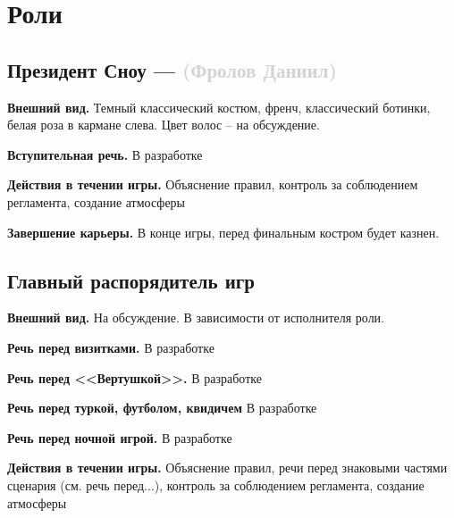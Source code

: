 \documentclass[a4paper, 14pt]{extarticle}
\theoremstyle{definition}
\begin{document}
\cleardoublepage
{}
{}
\section*{Роли}

{}
\subsection*{Президент Сноу --- \textcolor{lightgray}{(Фролов Даниил)}}

\par \textbf{Внешний вид.} Темный классический костюм, френч, классический ботинки, белая роза в кармане слева. Цвет волос -- на обсуждение.

\par \textbf{Вступительная речь.} В разработке

\par \textbf{Действия в течении игры.} Объяснение правил, контроль за соблюдением регламента, создание атмосферы

\par \textbf{Завершение карьеры.} В конце игры, перед финальным костром будет казнен.


{}
\subsection*{Главный распорядитель игр}

\par \textbf{Внешний вид.} На обсуждение. В зависимости от исполнителя роли.

\par \textbf{Речь перед визитками.} В разработке

\par \textbf{Речь перед <<Вертушкой>>.} В разработке

\par \textbf{Речь перед туркой, футболом, квидичем} В разработке

\par \textbf{Речь перед ночной игрой.} В разработке

\par \textbf{Действия в течении игры.} Объяснение правил, речи перед знаковыми частями сценария (см. речь перед...), контроль за соблюдением регламента, создание атмосферы
\end{document}

